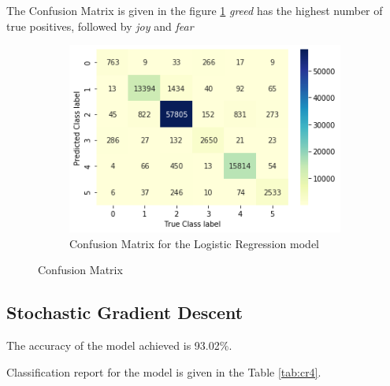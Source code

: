 \documentclass[a4paper, 12pt]{article}
\begin{document}
The Confusion Matrix is given in the figure \ref{fig:con3}
\textit{greed} has the highest number of true positives, followed by \textit{joy} and \textit{fear}
 
\begin{figure}[H]
    \centering
    \begin{subfigure}[a]{0.48\textwidth}
        \includegraphics[width=\textwidth]{res/con_lr.png}
        \caption{Confusion Matrix for the Logistic Regression model}
    \end{subfigure}
		\caption{Confusion Matrix}
		\label{fig:con3}
\end{figure}

\subsection{Stochastic Gradient Descent}
The accuracy of the model achieved is 93.02\%.

Classification report for the model is given in the Table \ref{tab:cr4}.
\end{document}
